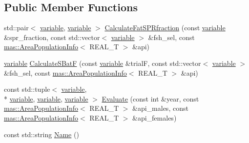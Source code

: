 \subsection*{Public Member Functions}
\begin{DoxyCompactItemize}
\item 
std\-::pair$<$ \hyperlink{structmas_1_1_n_p_f_m_c___tier3___h_c_r_a255d04535c769276bb11c0a7e003d775}{variable}, \hyperlink{structmas_1_1_n_p_f_m_c___tier3___h_c_r_a255d04535c769276bb11c0a7e003d775}{variable} $>$ \hyperlink{structmas_1_1_n_p_f_m_c___tier3___h_c_r_add1b49da6fec0371e54e5b729ba249fc}{Calculate\-Fat\-S\-P\-Rfraction} (const \hyperlink{structmas_1_1_n_p_f_m_c___tier3___h_c_r_a255d04535c769276bb11c0a7e003d775}{variable} \&spr\-\_\-fraction, const std\-::vector$<$ \hyperlink{structmas_1_1_n_p_f_m_c___tier3___h_c_r_a255d04535c769276bb11c0a7e003d775}{variable} $>$ \&fsh\-\_\-sel, const \hyperlink{structmas_1_1_area_population_info}{mas\-::\-Area\-Population\-Info}$<$ R\-E\-A\-L\-\_\-\-T $>$ \&api)
\item 
\hyperlink{structmas_1_1_n_p_f_m_c___tier3___h_c_r_a255d04535c769276bb11c0a7e003d775}{variable} \hyperlink{structmas_1_1_n_p_f_m_c___tier3___h_c_r_a41b3cf631b6c4d52c3539853efbbcf18}{Calculate\-S\-Bat\-F} (const \hyperlink{structmas_1_1_n_p_f_m_c___tier3___h_c_r_a255d04535c769276bb11c0a7e003d775}{variable} \&trial\-F, const std\-::vector$<$ \hyperlink{structmas_1_1_n_p_f_m_c___tier3___h_c_r_a255d04535c769276bb11c0a7e003d775}{variable} $>$ \&fsh\-\_\-sel, const \hyperlink{structmas_1_1_area_population_info}{mas\-::\-Area\-Population\-Info}$<$ R\-E\-A\-L\-\_\-\-T $>$ \&api)
\item 
const std\-::tuple$<$ \hyperlink{structmas_1_1_n_p_f_m_c___tier3___h_c_r_a255d04535c769276bb11c0a7e003d775}{variable}, \\*
\hyperlink{structmas_1_1_n_p_f_m_c___tier3___h_c_r_a255d04535c769276bb11c0a7e003d775}{variable}, \hyperlink{structmas_1_1_n_p_f_m_c___tier3___h_c_r_a255d04535c769276bb11c0a7e003d775}{variable}, \hyperlink{structmas_1_1_n_p_f_m_c___tier3___h_c_r_a255d04535c769276bb11c0a7e003d775}{variable} $>$ \hyperlink{structmas_1_1_n_p_f_m_c___tier3___h_c_r_af95105dd7d8a4a47ab028c34b35640ff}{Evaluate} (const int \&year, const \hyperlink{structmas_1_1_area_population_info}{mas\-::\-Area\-Population\-Info}$<$ R\-E\-A\-L\-\_\-\-T $>$ \&api\-\_\-males, const \hyperlink{structmas_1_1_area_population_info}{mas\-::\-Area\-Population\-Info}$<$ R\-E\-A\-L\-\_\-\-T $>$ \&api\-\_\-females)
\item 
const std\-::string \hyperlink{structmas_1_1_n_p_f_m_c___tier3___h_c_r_a1f7d15c97821f987d8b8ef1a2c8099a5}{Name} ()
\end{DoxyCompactItemize}
